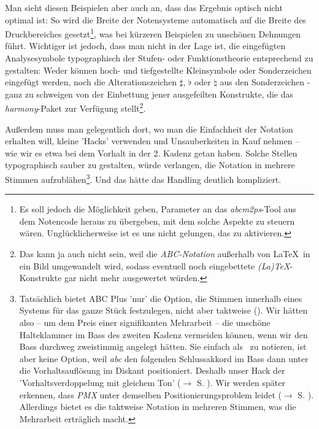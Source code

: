 Man sieht diesen Beispielen aber auch an, dass das Ergebnis optisch nicht
optimal ist: So wird die Breite der Notensysteme automatisch auf die Breite des
Druckbereiches gesetzt\footnote{Es soll jedoch die Möglichkeit geben, Parameter
an das \textit{abcm2ps}-Tool aus dem Notencode heraus zu übergeben, mit dem
solche Aspekte zu steuern wären. Unglücklicherweise ist es uns nicht gelungen,
das zu aktivieren.}, was bei kürzeren Beispielen zu unschönen Dehnungen führt.
\label{AppraisalABC}Wichtiger ist jedoch, dass man nicht in der Lage ist, die
eingefügten Analysesymbole typographisch der Stufen- oder Funktionstheorie
entsprechend zu gestalten: Weder können hoch- und tiefgestellte Kleinsymbole
oder Sonderzeichen eingefügt werden, noch die Alterationszeichen $\sharp$,
$\flat$ oder $\natural$ aus den Sonderzeichen - ganz zu schweigen von der
Einbettung jener ausgefeilten Konstrukte, die das \textit{harmony}-Paket zur
Verfügung stellt\footnote{Das kann ja auch nicht sein, weil die
\textit{ABC-Notation} außerhalb von \LaTeX\ in ein Bild umgewandelt wird, sodass
eventuell noch eingebettete \textit{(La)\TeX}-Konstrukte gar nicht mehr
ausgewertet würden.}.

Außerdem muss man gelegentlich dort, wo man die Einfachheit der Notation
erhalten will, kleine 'Hacks' verwenden und Unsauberkeiten in Kauf nehmen -- wie
wir es etwa bei dem Vorhalt in der 2. Kadenz getan haben. Solche Stellen
typographisch sauber zu gestalten, würde verlangen, die Notation in mehrere
Stimmen aufzublähen\footnote{Tatsächlich bietet ABC Plus 'nur' die Option, die
Stimmen innerhalb eines Systems für das ganze Stück festzulegen, nicht aber
taktweise (\cite[vgl.][49f]{Gonzato2018b}). Wir hätten also -- um dem Preis einer
signifikanten Mehrarbeit -- die unschöne Halteklammer im Bass des zweiten Kadenz
vermeiden können, wenn wir den Bass durchweg zweistimmig angelegt hätten. Sie
einfach als \Halb\ zu notieren, ist aber keine Option, weil \textit{abc} den
folgenden Schlussakkord im Bass dann unter die Vorhaltsauflösung im Diskant
positioniert. Deshalb unser Hack der 'Vorhaltsverdoppelung mit gleichem Ton'
($\rightarrow$ S. ). Wir werden später erkennen, dass
\textit{PMX} unter demselben Positionierungsproblem leidet ($\rightarrow$ S.
). Allerdings bietet es die taktweise Notation in
mehreren Stimmen, was die Mehrarbeit erträglich macht.
}. Und das hätte das Handling deutlich kompliziert.

